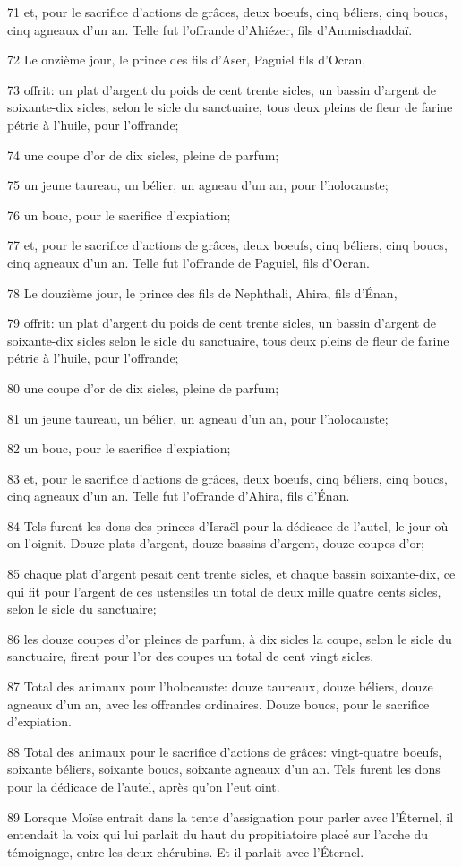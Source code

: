\par 71 et, pour le sacrifice d'actions de grâces, deux boeufs, cinq béliers, cinq boucs, cinq agneaux d'un an. Telle fut l'offrande d'Ahiézer, fils d'Ammischaddaï.
\par 72 Le onzième jour, le prince des fils d'Aser, Paguiel fils d'Ocran,
\par 73 offrit: un plat d'argent du poids de cent trente sicles, un bassin d'argent de soixante-dix sicles, selon le sicle du sanctuaire, tous deux pleins de fleur de farine pétrie à l'huile, pour l'offrande;
\par 74 une coupe d'or de dix sicles, pleine de parfum;
\par 75 un jeune taureau, un bélier, un agneau d'un an, pour l'holocauste;
\par 76 un bouc, pour le sacrifice d'expiation;
\par 77 et, pour le sacrifice d'actions de grâces, deux boeufs, cinq béliers, cinq boucs, cinq agneaux d'un an. Telle fut l'offrande de Paguiel, fils d'Ocran.
\par 78 Le douzième jour, le prince des fils de Nephthali, Ahira, fils d'Énan,
\par 79 offrit: un plat d'argent du poids de cent trente sicles, un bassin d'argent de soixante-dix sicles selon le sicle du sanctuaire, tous deux pleins de fleur de farine pétrie à l'huile, pour l'offrande;
\par 80 une coupe d'or de dix sicles, pleine de parfum;
\par 81 un jeune taureau, un bélier, un agneau d'un an, pour l'holocauste;
\par 82 un bouc, pour le sacrifice d'expiation;
\par 83 et, pour le sacrifice d'actions de grâces, deux boeufs, cinq béliers, cinq boucs, cinq agneaux d'un an. Telle fut l'offrande d'Ahira, fils d'Énan.
\par 84 Tels furent les dons des princes d'Israël pour la dédicace de l'autel, le jour où on l'oignit. Douze plats d'argent, douze bassins d'argent, douze coupes d'or;
\par 85 chaque plat d'argent pesait cent trente sicles, et chaque bassin soixante-dix, ce qui fit pour l'argent de ces ustensiles un total de deux mille quatre cents sicles, selon le sicle du sanctuaire;
\par 86 les douze coupes d'or pleines de parfum, à dix sicles la coupe, selon le sicle du sanctuaire, firent pour l'or des coupes un total de cent vingt sicles.
\par 87 Total des animaux pour l'holocauste: douze taureaux, douze béliers, douze agneaux d'un an, avec les offrandes ordinaires. Douze boucs, pour le sacrifice d'expiation.
\par 88 Total des animaux pour le sacrifice d'actions de grâces: vingt-quatre boeufs, soixante béliers, soixante boucs, soixante agneaux d'un an. Tels furent les dons pour la dédicace de l'autel, après qu'on l'eut oint.
\par 89 Lorsque Moïse entrait dans la tente d'assignation pour parler avec l'Éternel, il entendait la voix qui lui parlait du haut du propitiatoire placé sur l'arche du témoignage, entre les deux chérubins. Et il parlait avec l'Éternel.

